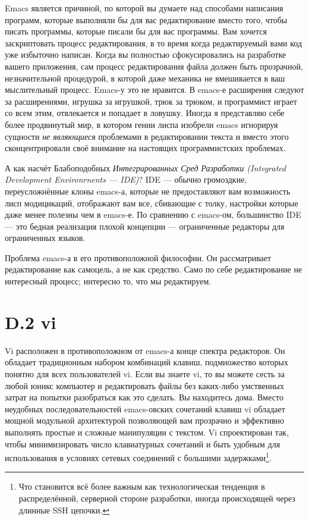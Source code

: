 Emacs является причиной, по которой вы думаете над способами написания программ, которые выполняли бы для вас редактирование вместо того, чтобы писать программы, которые писали бы для вас программы. Вам хочется заскриптовать процесс редактирования, в то время когда редактируемый вами код уже избыточно написан. Когда вы полностью сфокусировались на разработке вашего приложения, сам процесс редактирования файла должен быть прозрачной, незначительной процедурой, в которой даже механика не вмешивается в ваш мыслительный процесс. Emacs-у это не нравится. В emacs-е расширения следуют за расширениями, игрушка за игрушкой, трюк за трюком, и программист играет со всем этим, отвлекается и попадает в ловушку. Иногда я представляю себе более продвинутый мир, в котором гении лиспа изобрели emacs игнорируя сущности \emph{не являющиеся} проблемами в редактировании текста и вместо этого сконцентрировали своё внимание на настоящих программистских проблемах.

А как насчёт Блабоподобных \emph{Интегрированных Сред Разработки ({Integrated Development Environrnents} --- IDE)}? IDE --- обычно громоздкие, переусложнённые клоны emacs-а, которые не предоставляют вам возможность лисп модицикаций, отображают вам все, сбивающие с толку, настройки которые даже менее полезны чем в emacs-е. По сравнению с emacs-ом, большинство IDE --- это бедная реализация плохой концепции --- ограниченные редакторы для ограниченных языков.

Проблема emacs-а в его противоположной философии. Он рассматривает редактирование как самоцель, а не как средство. Само по себе редактирование не интересный процесс; интересно то, что мы редактируем.

\section*{D.2 vi}


Vi расположен в противоположном от emacs-а конце спектра редакторов. Он обладает традиционным набором комбинаций клавиш, подмножество которых понятно для всех пользователей vi. Если вы знаете vi, то вы можете сесть за любой юникс компьютер и редактировать файлы без каких-либо умственных затрат на попытки разобраться как это сделать. Вы находитесь дома. Вместо неудобных последовательностей emacs-овских сочетаний клавиш vi обладает мощной модульной архитектурой позволяющей вам прозрачно и эффективно выполнять простые и сложные манипуляции с текстом. Vi спроектирован так, чтобы минимизировать число клавиатурных сочетаний и быть удобным для использования в условиях сетевых соединений с большими задержками\footnote[1]{Что становится всё более важным как технологическая тенденция в распределённой, серверной стороне разработки, иногда происходящей через длинные SSH цепочки.}.

